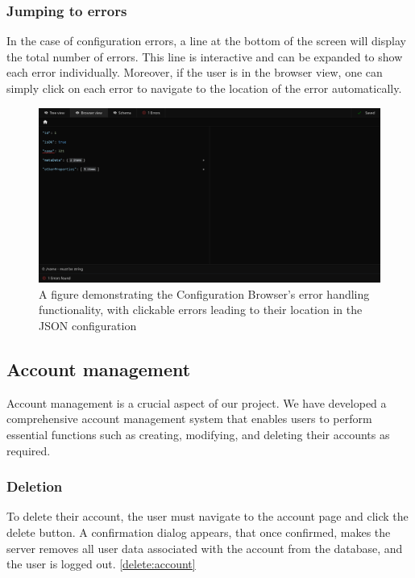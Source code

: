 \subsubsection{Jumping to errors}

In the case of configuration errors, a line at the bottom of the screen will display the total number of errors. This line is interactive and can be expanded to show each error individually. Moreover, if the user is in the browser view, one can simply click on each error to navigate to the location of the error automatically. 

\begin{figure}[!ht]
   \begin{minipage}{1\textwidth}
     \centering
     \includegraphics[width=.95\textwidth]{Figures/browser/error-crop.pdf}
     \caption[Error handling showcase]{A figure demonstrating the Configuration Browser’s error handling functionality, with clickable errors leading to their location in the JSON configuration}
     \label{errors:browser}
   \end{minipage}\hfill
\end{figure}

\subsection{Account management}

Account management is a crucial aspect of our project. We have developed a comprehensive account management system that enables users to perform essential functions such as creating, modifying, and deleting their accounts as required. 

\subsubsection{Deletion}

To delete their account, the user must navigate to the account page and click the delete button. A confirmation dialog appears, that once confirmed, makes the server removes all user data associated with the account from the database, and the user is logged out. \autoref{delete:account} \\

